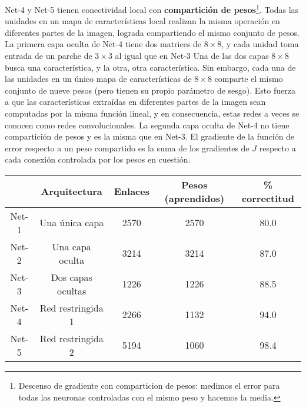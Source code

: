 Net-4 y Net-5 tienen conectividad local con \textbf{compartición de pesos}\footnote{Descenso de gradiente con comparticion de pesos: medimos el error para todas las neuronas controladas con el mismo peso y hacemos la media.}. Todas las unidades en un mapa de características local realizan la misma operación en diferentes partes de la imagen, lograda compartiendo el mismo conjunto de pesos. La primera capa oculta de Net-4 tiene dos matrices de $8 \times 8$, y cada unidad toma entrada de un parche de $3 \times 3$ al igual que en Net-3 Una de las dos capas $8 \times 8$ busca una característica, y la otra, otra característica. Sin embargo, cada una de las unidades en un único mapa de características de $8 \times 8$ comparte el mismo conjunto de nueve pesos (pero tienen su propio parámetro de sesgo). Esto fuerza a que las características extraídas en diferentes partes de la imagen sean computadas por la misma función lineal, y en consecuencia, estas redes a veces se conocen como redes convolucionales. La segunda capa oculta de Net-4 no tiene compartición de pesos y es la misma que en Net-3. El gradiente de la función de error respecto a un peso compartido es la suma de los gradientes de $J$ respecto a cada conexión controlada por los pesos en cuestión. \\

\begin{table}[h]
\centering
\begin{tabular}{ccccc}
\hline \hline 
 & Arquitectura & Enlaces & Pesos (aprendidos) & \% correctitud \\ \hline \hline 
Net-1 & Una única capa & 2570 & 2570 & 80.0 \\
Net-2 & Una capa oculta & 3214 & 3214 & 87.0 \\
Net-3 & Dos capas ocultas & 1226 & 1226 & 88.5 \\
Net-4 & Red restringida 1 & 2266 & 1132 & 94.0 \\
Net-5 & Red restringida 2 & 5194 & 1060 & 98.4 \\ \hline
\end{tabular}
\label{tab:7.1}
\end{table}

